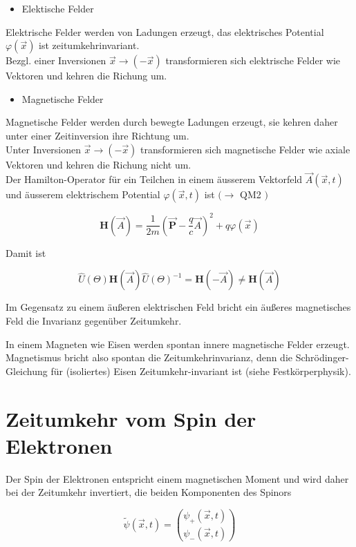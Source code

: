 \documentclass[10pt, letterpaper]{article}
\begin{document}
\begin{itemize}
  \item Elektische Felder
\end{itemize}

Elektrische Felder werden von Ladungen erzeugt, das elektrisches Potential $\varphi(\vec{x})$ ist zeitumkehrinvariant.\\
Bezgl. einer Inversionen $\vec{x} \rightarrow(-\vec{x})$ transformieren sich elektrische Felder wie Vektoren und kehren die Richung um.

\begin{itemize}
  \item Magnetische Felder
\end{itemize}

Magnetische Felder werden durch bewegte Ladungen erzeugt, sie kehren daher unter einer Zeitinversion ihre Richtung um.\\
Unter Inversionen $\vec{x} \rightarrow(-\vec{x})$ transformieren sich magnetische Felder wie axiale Vektoren und kehren die Richung nicht um.\\
Der Hamilton-Operator für ein Teilchen in einem äusserem Vektorfeld $\vec{A}(\vec{x}, t)$ und äusserem elektrischem Potential $\varphi(\vec{x}, t)$ ist $(\rightarrow$ QM2 $)$

$$
\mathbf{H}(\vec{A})=\frac{1}{2 m}\left(\overrightarrow{\mathbf{P}}-\frac{q}{c} \vec{A}\right)^{2}+q \varphi(\vec{x})
$$

Damit ist

$$
\widehat{U}(\Theta) \mathbf{H}(\vec{A}) \widehat{U}(\Theta)^{-1}=\mathbf{H}(-\vec{A}) \neq \mathbf{H}(\vec{A})
$$

Im Gegensatz zu einem äußeren elektrischen Feld bricht ein äußeres magnetisches Feld die Invarianz gegenüber Zeitumkehr.

In einem Magneten wie Eisen werden spontan innere magnetische Felder erzeugt. Magnetismus bricht also spontan die Zeitumkehrinvarianz, denn die Schrödinger-Gleichung für (isoliertes) Eisen Zeitumkehr-invariant ist (siehe Festkörperphysik).

\section*{Zeitumkehr vom Spin der Elektronen}
Der Spin der Elektronen entspricht einem magnetischen Moment und wird daher bei der Zeitumkehr invertiert, die beiden Komponenten des Spinors

$$
\widetilde{\psi}(\vec{x}, t)=\binom{\psi_{+}(\vec{x}, t)}{\psi_{-}(\vec{x}, t)}
$$
\end{document}
